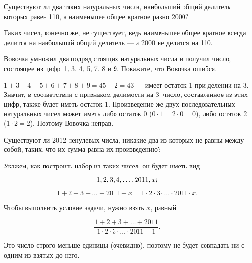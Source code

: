 

\begin{itemize}
\itA Существуют ли два таких натуральных числа, наибольший общий делитель которых равен 110, а наименьшее общее кратное равно 2000?

\itr Таких чисел, конечно же, не существует, ведь наименьшее общее кратное всегда делится на наибольший общий делитель — а 2000 не делится на 110.

\itB Вовочка умножил два подряд стоящих натуральных числа и получил число, состоящее из цифр~1, 3, 4, 5, 7, 8 и 9. Покажите, что Вовочка ошибся.

\itr $1+3+4+5+6+7+8+9=45-2=43$ — имеет остаток 1 при делении на 3. Значит, в соответствии с признаком делимости на 3, число, составленное из этих цифр, также будет иметь остаток 1. Произведение же двух последовательных натуральных чисел может иметь либо остаток 0 ($0 \cdot 1 = 2 \cdot 0 = 0$), либо остаток 2 ($1 \cdot 2 = 2$). Поэтому Вовочка неправ.

\itC Существуют ли 2012 ненулевых числа, никакие два из которых не равны между собой, таких, что их сумма равна их произведению?

\itr Укажем, как построить набор из таких чисел: он будет иметь вид

\vspace{-0.4cm}
$$1, 2, 3, 4, \ldots, 2011, x\scolon$$

\vspace{-0.4cm}
$$1+2+3+\ldots+2011+x=1\cdot 2\cdot 3\cdot\ldots\cdot2011\cdot x.$$

Чтобы выполнить условие задачи, нужно взять $x$, равный

$$\frac{1+2+3+\ldots+2011}{1 \cdot 2 \cdot 3 \cdot \ldots \cdot 2011 - 1}.$$

Это число строго меньше единицы (очевидно), поэтому не будет совпадать ни с одним из взятых до него.
\end{itemize}


